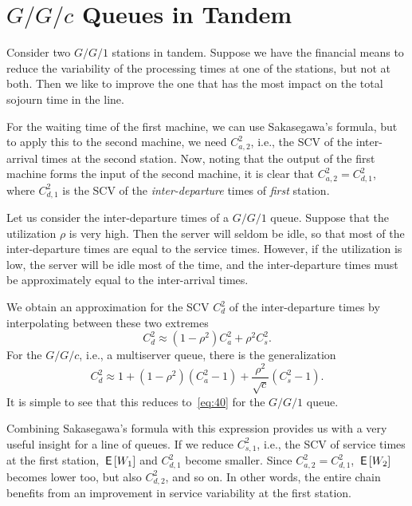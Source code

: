 \documentclass[queueing-book.tex]{subfiles}
\begin{document}
\section{\texorpdfstring{$G/G/c$}{GGc} Queues in Tandem}
\label{sec:tandem-queues}


Consider two $G/G/1$ stations in tandem.
Suppose we have the financial means to reduce the variability of the processing times at  one of the stations, but not at both.
Then we like to improve the one that has the most impact on the total sojourn time in the line.

For the waiting time of the first machine, we can use Sakasegawa's formula, but to apply this to the second machine, we need $C^2_{a,2}$, i.e., the SCV of the inter-arrival times at the second station.
Now, noting that the output of the first machine forms the input of the second machine, it is clear that $C^2_{a,2}=C^2_{d,1}$, where $C^2_{d,1}$ is the SCV of the \emph{inter-departure} times of \emph{first} station.


Let us consider the inter-departure times of a $G/G/1$ queue.
Suppose that the  utilization $\rho$ is very high.
Then the server will seldom be idle, so that most of the inter-departure times are equal to the service times.
However, if the utilization is low, the server will be idle most of the time, and the inter-departure times must be approximately equal to the inter-arrival times.

We obtain an  approximation for the SCV $C_{d}^2$ of the inter-departure times by  interpolating between these two extremes
\begin{equation} \label{eq:40}
 C_{d}^2 \approx  (1-\rho^2) C_{a}^2 + \rho^2 C_{s}^2.
\end{equation}
For the $G/G/c$, i.e., a multiserver queue, there is the generalization
\begin{equation*}
 C_{d}^2 \approx 1 + (1-\rho^2)(C_{a}^2-1) + \frac{\rho^2}{\sqrt{c}}(C_{s}^2-1).
\end{equation*}
It is simple to see that this reduces to~\cref{eq:40} for the $G/G/1$ queue.

Combining Sakasegawa's formula with this expression provides us with a very useful insight for a line of queues.
If we reduce $C^2_{s,1}$, i.e., the SCV of service times at the first station, $\,\mathsf{E}\left[W_1\right]$ and $C^2_{d,1}$ become smaller.
Since $C^2_{a,2}=C^2_{d,1}$, $\,\mathsf{E}\left[W_2\right]$ becomes lower too, but also $C^2_{d,2}$, and so on.
In other words, the entire chain benefits from an improvement in service variability at the first station.
\end{document}
